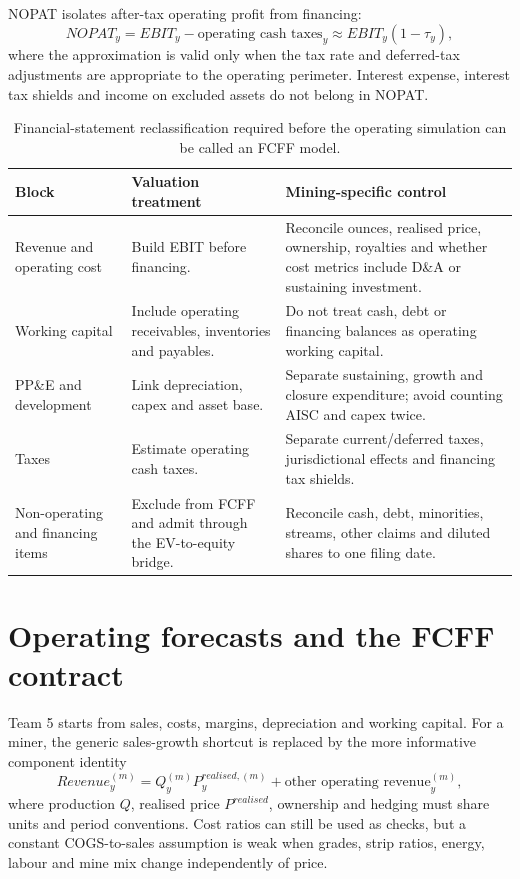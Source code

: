 NOPAT isolates after-tax operating profit from financing:
\begin{equation}
NOPAT_y=EBIT_y-\text{operating cash taxes}_y
       \approx EBIT_y(1-\tau_y),
\end{equation}
where the approximation is valid only when the tax rate and deferred-tax
adjustments are appropriate to the operating perimeter. Interest expense,
interest tax shields and income on excluded assets do not belong in NOPAT.

\begin{table}[H]
\centering
\small
\renewcommand{\arraystretch}{1.10}
\begin{tabularx}{\textwidth}{@{}p{3.0cm}p{4.2cm}X@{}}
\toprule
Block & Valuation treatment & Mining-specific control \\
\midrule
Revenue and operating cost & Build EBIT before financing. & Reconcile ounces,
realised price, ownership, royalties and whether cost metrics include D\&A or
sustaining investment. \\
Working capital & Include operating receivables, inventories and payables. &
Do not treat cash, debt or financing balances as operating working capital. \\
PP\&E and development & Link depreciation, capex and asset base. & Separate
sustaining, growth and closure expenditure; avoid counting AISC and capex
twice. \\
Taxes & Estimate operating cash taxes. & Separate current/deferred taxes,
jurisdictional effects and financing tax shields. \\
Non-operating and financing items & Exclude from FCFF and admit through the
EV-to-equity bridge. & Reconcile cash, debt, minorities, streams, other claims
and diluted shares to one filing date. \\
\bottomrule
\end{tabularx}
\caption{Financial-statement reclassification required before the operating
simulation can be called an FCFF model.}
\label{tab:dcf-reclassification}
\end{table}

\section{Operating forecasts and the FCFF contract}

Team 5 starts from sales, costs, margins, depreciation and working capital.
For a miner, the generic sales-growth shortcut is replaced by the more
informative component identity
\begin{equation}
Revenue_y^{(m)}=Q_y^{(m)}P_y^{realised,(m)}+\text{other operating revenue}_y^{(m)},
\end{equation}
where production \(Q\), realised price \(P^{realised}\), ownership and hedging
must share units and period conventions. Cost ratios can still be used as
checks, but a constant COGS-to-sales assumption is weak when grades, strip
ratios, energy, labour and mine mix change independently of price.

